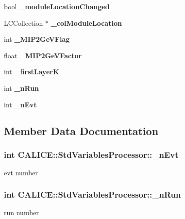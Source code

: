 \begin{DoxyCompactItemize}
\item 
bool {\bfseries \-\_\-module\-Location\-Changed}\label{classCALICE_1_1StdVariablesProcessor_a85d5e073ae94886a002bb3276c7ca6f1}

\item 
L\-C\-Collection $\ast$ {\bfseries \-\_\-col\-Module\-Location}\label{classCALICE_1_1StdVariablesProcessor_a947bfa01350791851bf2f4a4e7f07049}

\item 
int {\bfseries \-\_\-\-M\-I\-P2\-Ge\-V\-Flag}\label{classCALICE_1_1StdVariablesProcessor_a2eaa6e0a04c49c619121c4c1e3d34554}

\item 
float {\bfseries \-\_\-\-M\-I\-P2\-Ge\-V\-Factor}\label{classCALICE_1_1StdVariablesProcessor_a9b268ddaa721e3f513bfd64c99ccef81}

\item 
int {\bfseries \-\_\-first\-Layer\-K}\label{classCALICE_1_1StdVariablesProcessor_a46553445ca3521b4e1b03db7881de7eb}

\item 
int {\bf \-\_\-n\-Run}
\item 
int {\bf \-\_\-n\-Evt}
\end{DoxyCompactItemize}


\subsection{Member Data Documentation}
\subsubsection[{\-\_\-n\-Evt}]{\setlength{\rightskip}{0pt plus 5cm}int C\-A\-L\-I\-C\-E\-::\-Std\-Variables\-Processor\-::\-\_\-n\-Evt\hspace{0.3cm}{\ttfamily [protected]}}\label{classCALICE_1_1StdVariablesProcessor_af5fab38a7f311ea31545e5acd271dc48}
evt number 
\subsubsection[{\-\_\-n\-Run}]{\setlength{\rightskip}{0pt plus 5cm}int C\-A\-L\-I\-C\-E\-::\-Std\-Variables\-Processor\-::\-\_\-n\-Run\hspace{0.3cm}{\ttfamily [protected]}}\label{classCALICE_1_1StdVariablesProcessor_afe1e269790b0eeaca2eacef43d3b6307}
run number 

